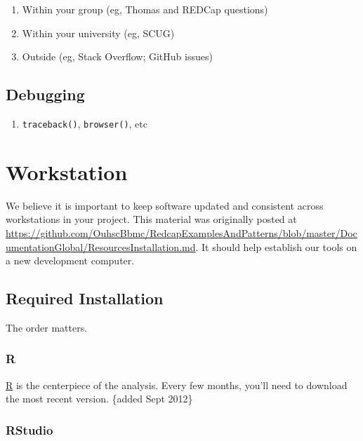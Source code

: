 \documentclass[]{book}
\providecommand{\tightlist}{%
  \setlength{\itemsep}{0pt}\setlength{\parskip}{0pt}}
\begin{document}
\begin{enumerate}
\def\labelenumi{\arabic{enumi}.}
\tightlist
\item
  Within your group (eg, Thomas and REDCap questions)
\item
  Within your university (eg, SCUG)
\item
  Outside (eg, Stack Overflow; GitHub issues)
\end{enumerate}

\hypertarget{debugging}{%
\section{Debugging}\label{debugging}}

\begin{enumerate}
\def\labelenumi{\arabic{enumi}.}
\tightlist
\item
  \texttt{traceback()}, \texttt{browser()}, etc
\end{enumerate}

\hypertarget{workstation}{%
\chapter{Workstation}\label{workstation}}

We believe it is important to keep software updated and consistent across workstations in your project. This material was originally posted at \url{https://github.com/OuhscBbmc/RedcapExamplesAndPatterns/blob/master/DocumentationGlobal/ResourcesInstallation.md}. It should help establish our tools on a new development computer.

\hypertarget{installation-required}{%
\section{Required Installation}\label{installation-required}}

The order matters.

\hypertarget{r}{%
\subsection{R}\label{r}}

\href{http://cran.r-project.org/}{R} is the centerpiece of the analysis. Every few months, you'll need to download the most recent version. \{added Sept 2012\}

\hypertarget{rstudio}{%
\subsection{RStudio}\label{rstudio}}
\end{document}

